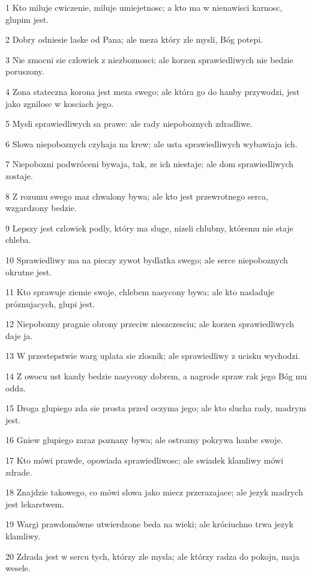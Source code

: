 \par 1 Kto miluje cwiczenie, miluje umiejetnosc; a kto ma w nienawisci karnosc, glupim jest.
\par 2 Dobry odniesie laske od Pana; ale meza który zle mysli, Bóg potepi.
\par 3 Nie zmocni sie czlowiek z niezboznosci; ale korzen sprawiedliwych nie bedzie poruszony.
\par 4 Zona stateczna korona jest meza swego; ale która go do hanby przywodzi, jest jako zgnilosc w kosciach jego.
\par 5 Mysli sprawiedliwych sa prawe: ale rady niepoboznych zdradliwe.
\par 6 Slowa niepoboznych czyhaja na krew; ale usta sprawiedliwych wybawiaja ich.
\par 7 Niepobozni podwróceni bywaja, tak, ze ich niestaje; ale dom sprawiedliwych zostaje.
\par 8 Z rozumu swego maz chwalony bywa; ale kto jest przewrotnego serca, wzgardzony bedzie.
\par 9 Lepszy jest czlowiek podly, który ma sluge, nizeli chlubny, któremu nie staje chleba.
\par 10 Sprawiedliwy ma na pieczy zywot bydlatka swego; ale serce niepoboznych okrutne jest.
\par 11 Kto sprawuje ziemie swoje, chlebem nasycony bywa; ale kto nasladuje próznujacych, glupi jest.
\par 12 Niepobozny pragnie obrony przeciw nieszczesciu; ale korzen sprawiedliwych daje ja.
\par 13 W przestepstwie warg uplata sie zlosnik; ale sprawiedliwy z ucisku wychodzi.
\par 14 Z owocu ust kazdy bedzie nasycony dobrem, a nagrode spraw rak jego Bóg mu odda.
\par 15 Droga glupiego zda sie prosta przed oczyma jego; ale kto slucha rady, madrym jest.
\par 16 Gniew glupiego zaraz poznany bywa; ale ostrozny pokrywa hanbe swoje.
\par 17 Kto mówi prawde, opowiada sprawiedliwosc; ale swiadek klamliwy mówi zdrade.
\par 18 Znajdzie takowego, co mówi slowa jako miecz przerazajace; ale jezyk madrych jest lekarstwem.
\par 19 Wargi prawdomówne utwierdzone beda na wieki; ale króciuchno trwa jezyk klamliwy.
\par 20 Zdrada jest w sercu tych, którzy zle mysla; ale którzy radza do pokoju, maja wesele.
